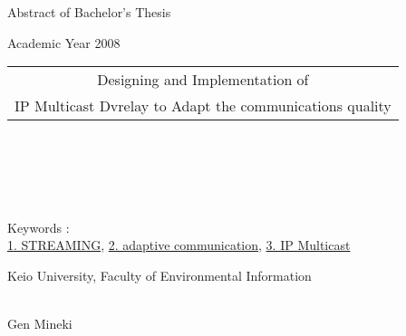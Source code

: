 	Abstract of Bachelor's Thesis

\begin{flushright}
Academic Year 2008
\end{flushright}

\begin{center}
\begin{Large}
\begin{tabular}{|c|} \hline
Designing and Implementation of \\
IP Multicast Dvrelay to Adapt the communications quality \\
\hline
\end{tabular}
\end{Large}
\end{center}
~ \bigskip ~ \\
~ \bigskip ~ \\

\indent

~ \bigskip ~ \\
~ \bigskip ~ \\
Keywords : \\
\underline{1. STREAMING}, \underline{2. adaptive communication},
\underline{3. IP Multicast}\\

\begin{flushright}
Keio University, Faculty of Environmental Information\\
~ \\
\begin{Large}
Gen Mineki
\end{Large}
\end{flushright}
